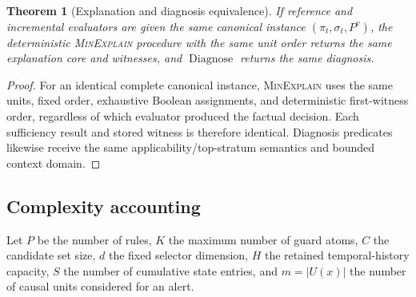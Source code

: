 \documentclass[11pt]{article}
\newtheorem{theorem}{Theorem}[section]
\theoremstyle{remark}
\newcommand{\Diagnose}{\operatorname{Diagnose}}
\begin{document}
\begin{theorem}[Explanation and diagnosis equivalence]\label{thm:expleq}
If reference and incremental evaluators are given the same canonical instance $(\pi_t,\sigma_t,P^v)$, the deterministic \textsc{MinExplain} procedure with the same unit order returns the same explanation core and witnesses, and $\Diagnose$ returns the same diagnosis.
\end{theorem}
\begin{proof}
For an identical complete canonical instance, \textsc{MinExplain} uses the same units, fixed order, exhaustive Boolean assignments, and deterministic first-witness order, regardless of which evaluator produced the factual decision. Each sufficiency result and stored witness is therefore identical. Diagnosis predicates likewise receive the same applicability/top-stratum semantics and bounded context domain.
\end{proof}

\subsection{Complexity accounting}
Let $P$ be the number of rules, $K$ the maximum number of guard atoms, $C$ the candidate set size, $d$ the fixed selector dimension, $H$ the retained temporal-history capacity, $S$ the number of cumulative state entries, and $m=|U(x)|$ the number of causal units considered for an alert.
\end{document}
